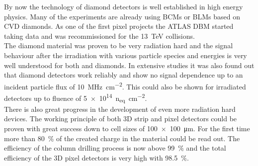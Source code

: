 By now the technology of diamond detectors is well established in high energy physics. Many of the experiments are already using \acp{BCM} or \acp{BLM} based on \ac{CVD} diamonds. As one of the first pixel projects the ATLAS \ac{DBM} started taking data and was recommissioned for the \SI{13}{\tera\electronvolt} collisions.\\
The diamond material was proven to be very radiation hard and the signal behaviour after the irradiation with various particle species and energies is very well understood for both \sccvd and \pcvd diamonds. In extensive studies it was also found out that \pcvd diamond detectors work reliably and show no signal dependence up to an incident particle flux of \SI{10}{\mega\hertz\per\centi\meter^2}. This could also be shown for irradiated detectors up to fluence of \SI{5e14}{n_{eq}\per \centi\meter^2}.\\
There is also great progress in the development of even more radiation hard devices. The working principle of both 3D strip and pixel detectors could be proven with great success down to cell sizes of \SI{100x100}{\micro\meter}. For the first time more than \SI{80}{\%} of the created charge in the material could be read out. The efficiency of the column drilling process is now above \SI{99}{\%} and the total efficiency of the 3D pixel detectors is very high with \SI{98.5}{\%}.